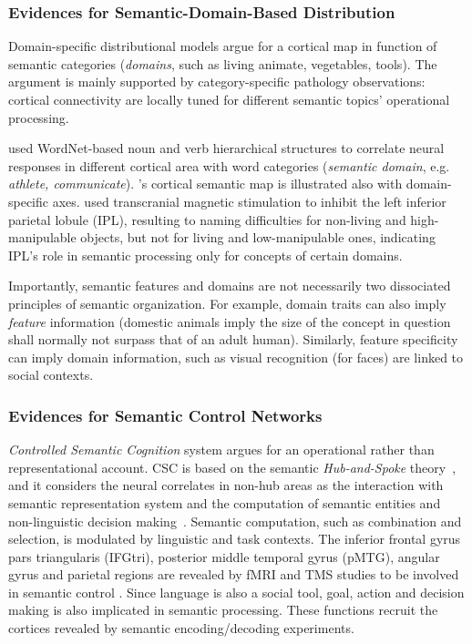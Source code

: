\subsubsection{Evidences for Semantic-Domain-Based Distribution}

Domain-specific distributional models \parencite{damasioNeuralBasisLexical1996, damasioNeuralSystemsWord2004, mahonWhatDrivesOrganization2011} argue for a cortical map in function of semantic categories (\emph{domains}, such as living animate, vegetables, tools). The argument is mainly supported by category-specific pathology observations: cortical connectivity are locally tuned for different semantic topics' operational processing. 

\textcite{huthContinuousSemanticSpace2012} used WordNet-based noun and verb hierarchical structures to correlate neural responses in different cortical area with word categories (\emph{semantic domain}, e.g. \emph{athlete, communicate}). \textcite{huthNaturalSpeechReveals2016}'s cortical semantic map is illustrated also with domain-specific axes. \textcite{pobricCategorySpecificCategoryGeneralSemantic2010} used transcranial magnetic stimulation to inhibit the left inferior parietal lobule (IPL), resulting to naming difficulties for non-living and high-manipulable objects, but not for living and low-manipulable ones, indicating IPL's role in semantic processing only for concepts of certain domains.

Importantly, semantic features and domains are not necessarily two dissociated principles of semantic organization. For example, domain traits can also imply \emph{feature} information (domestic animals imply the size of the concept in question shall normally not surpass that of an adult human). Similarly, feature specificity can imply domain information, such as visual recognition (for faces) are linked to social contexts.

\subsubsection{Evidences for Semantic Control Networks}
\emph{Controlled Semantic Cognition} \parencite{lambon-ralphNeuralComputationalBases2017} system argues for an operational rather than representational account. CSC is based on the semantic \emph{Hub-and-Spoke} theory~\parencite{pattersonWhereYouKnow2007}, and it considers the neural correlates in non-hub areas as the interaction with semantic representation system and the computation of semantic entities and non-linguistic decision making~\parencite{fusterUpperProcessingStages2004}. Semantic computation, such as combination and selection, is modulated by linguistic and task contexts. The inferior frontal gyrus pars triangularis (IFGtri), posterior middle temporal gyrus (pMTG), angular gyrus and parietal regions are revealed by fMRI and TMS studies to be involved in semantic control \parencite{noonanGoingInferiorPrefrontal2013}. Since language is also a social tool, goal, action and decision making is also implicated in semantic processing. These functions recruit the cortices revealed by semantic encoding/decoding experiments.

